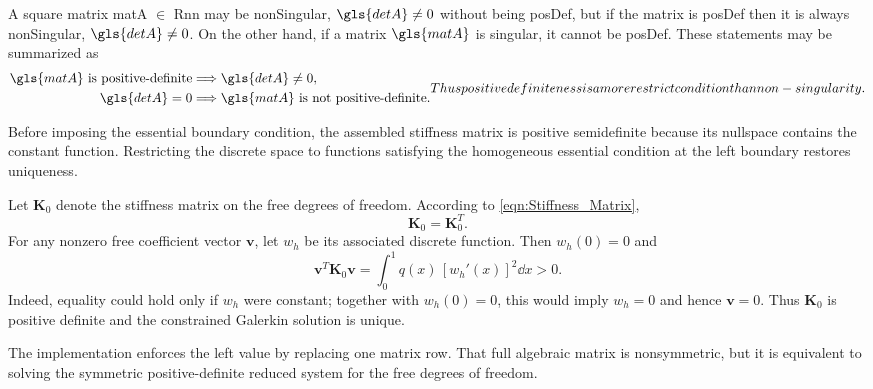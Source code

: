 \begin{remark}
	A square matrix \gls{matA} $\in$ \gls{Rnn} may be \gls{nonSingular}, $\gls{detA} \neq 0$ without being \gls{posDef}, but
	if the matrix is \gls{posDef} then it is always \gls{nonSingular}, $\gls{detA} \neq 0$. On the other hand, if a matrix
	$\gls{matA}$ is \gls{singular}, it cannot be \gls{posDef}. These statements may be summarized as
	\begin{subequations}
		\begin{align} 
			\gls{matA} \text{ is positive-definite} & \Longrightarrow \gls{detA} \neq 0, \\
			\gls{detA} = 0 & \Longrightarrow \gls{matA} \text{ is not positive-definite}.
		\end{align}
		Thus positive definiteness is a more restrict condition than non-singularity.
	\end{subequations}
\end{remark}

Before imposing the essential boundary condition, the assembled stiffness matrix is positive semidefinite because its nullspace
contains the constant function. Restricting the discrete space to functions satisfying the homogeneous essential condition at the
left boundary restores uniqueness.

Let $\mathbf{K}_0$ denote the stiffness matrix on the free degrees of freedom. According to \cref{eqn:Stiffness_Matrix},
\begin{equation}
	\mathbf{K}_0 = \mathbf{K}_0^T.
\end{equation}
For any nonzero free coefficient vector $\mathbf{v}$, let $w_h$ be its associated discrete function. Then $w_h(0)=0$ and
\begin{equation}
	\mathbf{v}^{T}\mathbf{K}_0\mathbf{v}
	= \int_0^1 q(x)\,[w_h'(x)]^2 \dd x > 0. \label{eqn:Pos_Def_Simplified}
\end{equation}
Indeed, equality could hold only if $w_h$ were constant; together with $w_h(0)=0$, this would imply $w_h=0$ and hence $\mathbf{v}=0$. Thus $\mathbf{K}_0$ is positive definite and the constrained Galerkin solution is unique.

The implementation enforces the left value by replacing one matrix row. That full algebraic matrix is nonsymmetric, but it is equivalent to solving the symmetric positive-definite reduced system for the free degrees of freedom.
%
